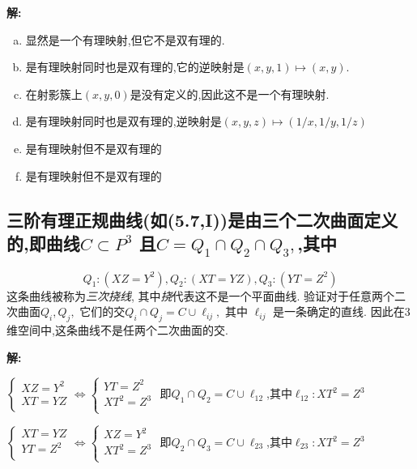 \documentclass[UTF8]{book}
\begin{document}
		\textbf{解:}
		\begin{enumerate}[(a)]
			\item 显然是一个有理映射,但它不是双有理的.
			\item 是有理映射同时也是双有理的,它的逆映射是$(x, y,1) \mapsto(x, y)$. 
			\item 在射影簇上$ (x, y, 0) $是没有定义的,因此这不是一个有理映射.
			\item 是有理映射同时也是双有理的,逆映射是$(x, y, z) \mapsto(1 / x, 1 / y, 1 / z)$ 
			\item 是有理映射但不是双有理的 
			\item 是有理映射但不是双有理的
		\end{enumerate}
	
		\subsection{三阶有理正规曲线(如(5.7,I))是由三个二次曲面定义的,即曲线$C \subset P ^{3}$ 且$C=Q_{1} \cap Q_{2} \cap Q_{3},$,其中}
			\begin{equation*}
			Q _{1}:\left( XZ = Y ^{2}\right), Q _{2} :( XT = YZ ), Q _{3}:\left( YT = Z ^{2}\right)
			\end{equation*}
		这条曲线被称为\textit{三次挠线}, 其中\textit{挠}代表这不是一个平面曲线. 验证对于任意两个二次曲面$Q_{i}, Q_{j},$ 它们的交$Q _{ i } \cap Q _{ j }= C \cup \ell_{ i j},$ 其中 $\ell_{ i j}$ 是一条确定的直线. 因此在3维空间中,这条曲线不是任两个二次曲面的交.
		
		\textbf{解:}
		
		$
		\left\{
		\begin{aligned}
		XZ = Y ^{2} \\
		XT = YZ\\
		\end{aligned}
		\right.
		\Longleftrightarrow
		\left\{
		\begin{aligned}
		YT = Z ^{2} \\
		XT^{2} = Z^{3}\\
		\end{aligned}
		\right.
		$
		即$Q _{ 1 } \cap Q _{ 2 }= C \cup \ell_{ 12}$,其中$\ell_{ 12}: XT^{2} = Z^{3}  $
		
		$
		\left\{
		\begin{aligned}
		XT = YZ \\
		YT = Z ^{2}\\
		\end{aligned}
		\right.
		\Longleftrightarrow
		\left\{
		\begin{aligned}
		XZ = Y ^{2} \\
		XT^{2} = Z^{3}\\
		\end{aligned}
		\right.
		$
		即$Q _{ 2 } \cap Q _{ 3 }= C \cup \ell_{ 23}$,其中$\ell_{ 23}: XT^{2} = Z^{3}  $
		
\end{document}

